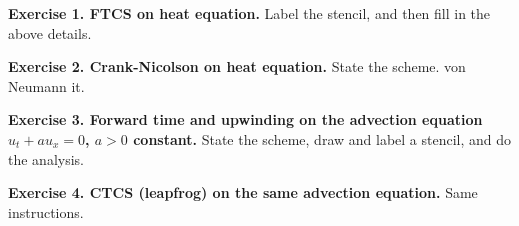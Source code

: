 \documentclass[11pt]{amsart}
\newcommand{\prob}[1]{\bigskip\noindent\textbf{#1.}\quad }
\begin{document}
\bigskip
\prob{Exercise 1. FTCS on heat equation}  Label the stencil, and then fill in the above details.

\bigskip
\hfill 
\vfill


\clearpage
\newpage
\prob{Exercise 2. Crank-Nicolson on heat equation}  State the scheme.  von Neumann it.

\bigskip
\hfill 
\vfill

\prob{Exercise 3. Forward time and upwinding on the advection equation $u_t + a u_x = 0$, $a>0$ constant}  State the scheme, draw and label a stencil, and do the analysis.
\vfill

\prob{Exercise 4. CTCS (leapfrog) on the same advection equation}  Same instructions.
\vfill
\end{document}
